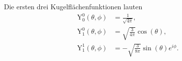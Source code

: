 Die ersten drei Kugelflächenfunktionen lauten
\begin{align}
	\text{Y}^0_0(\theta,\phi) &= \frac{1}{\sqrt{4\pi}}, \\
	\text{Y}^0_1(\theta,\phi) &= \sqrt{\frac{3}{4\pi}}\cos(\theta), \\
	\text{Y}^1_1(\theta,\phi) &= -\sqrt{\frac{3}{8\pi}}\sin(\theta)e^{i\phi}.
\end{align}
